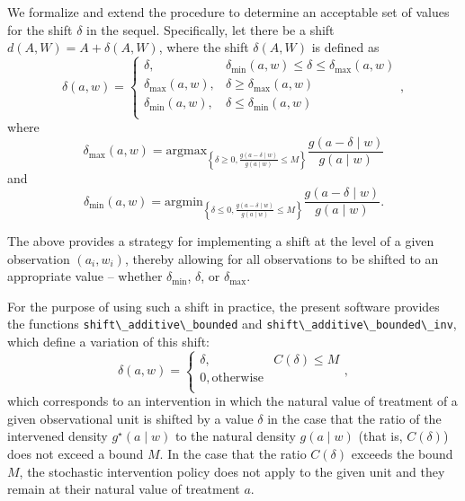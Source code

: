\documentclass[12pt, krantz2,]{krantz}
\newcommand{\passthrough}[1]{#1}
\theoremstyle{definition}
\theoremstyle{definition}
\theoremstyle{definition}
\newcommand{\1}{\mathbbm{1}}
\begin{document}
We formalize and extend the procedure to determine an acceptable set of values
for the shift \(\delta\) in the sequel. Specifically, let there be a shift \(d(A, W) = A + \delta(A, W)\), where the shift \(\delta(A, W)\) is defined as
\begin{equation}
  \delta(a, w) =
    \begin{cases}
      \delta, & \delta_{\text{min}}(a,w) \leq \delta \leq
        \delta_{\text{max}}(a,w) \\
      \delta_{\text{max}}(a,w), & \delta \geq \delta_{\text{max}}(a,w) \\
      \delta_{\text{min}}(a,w), & \delta \leq \delta_{\text{min}}(a,w) \\
    \end{cases},
\end{equation}
where \[\delta_{\text{max}}(a, w) = \text{argmax}_{\left\{\delta \geq 0,
\frac{g(a - \delta \mid w)}{g(a \mid w)} \leq M \right\}} \frac{g(a - \delta
\mid w)}{g(a \mid w)}\] and
\[\delta_{\text{min}}(a, w) = \text{argmin}_{\left\{\delta \leq 0,
\frac{g(a - \delta \mid w)}{g(a \mid w)} \leq M \right\}} \frac{g(a - \delta
\mid w)}{g(a \mid w)}.\]

The above provides a strategy for implementing a shift at the level of a given
observation \((a_i, w_i)\), thereby allowing for all observations to be shifted
to an appropriate value -- whether \(\delta_{\text{min}}\), \(\delta\), or
\(\delta_{\text{max}}\).

For the purpose of using such a shift in practice, the present software
provides the functions \passthrough{\lstinline!shift\_additive\_bounded!} and
\passthrough{\lstinline!shift\_additive\_bounded\_inv!}, which define a variation of this shift:
\begin{equation}
  \delta(a, w) =
    \begin{cases}
      \delta, & C(\delta) \leq M \\
      0, \text{otherwise} \\
    \end{cases},
  \label{eq:shift-simple}
\end{equation}
which corresponds to an intervention in which the natural value of treatment
of a given observational unit is shifted by a value \(\delta\) in the case that
the ratio of the intervened density \(g^{\star}(a \mid w)\) to the natural
density \(g(a \mid w)\) (that is, \(C(\delta)\)) does not exceed a bound \(M\). In
the case that the ratio \(C(\delta)\) exceeds the bound \(M\), the stochastic
intervention policy does not apply to the given unit and they remain at their
natural value of treatment \(a\).
\end{document}
